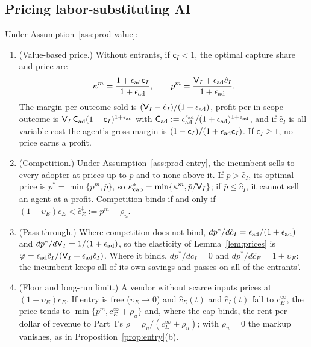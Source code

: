 \subsection{Pricing labor-substituting AI}\label{sec:product-price}

\begin{proposition}\label{prop:prod-price}
Under Assumption~\ref{ass:prod-value}:
\begin{enumerate}
\item[(a)] (Value-based price.) Without entrants, if $\mathsf c_I<1$, the optimal capture share and price are
\begin{equation}\label{eq:prod-kappa}
\kappa^m=\frac{1+\epsilon_{\rm ad}\mathsf c_I}{1+\epsilon_{\rm ad}},\qquad p^m=\frac{\mathsf V_I+\epsilon_{\rm ad}\hat c_I}{1+\epsilon_{\rm ad}} .
\end{equation}
The margin per outcome sold is $(\mathsf V_I-\hat c_I)/(1+\epsilon_{\rm ad})$, profit per in-scope outcome is $\mathsf V_I\,\mathsf C_{\rm ad}(1-\mathsf c_I)^{1+\epsilon_{\rm ad}}$ with $\mathsf C_{\rm ad}:=\epsilon_{\rm ad}^{\epsilon_{\rm ad}}/(1+\epsilon_{\rm ad})^{1+\epsilon_{\rm ad}}$, and if $\hat c_I$ is all variable cost the agent's gross margin is $(1-\mathsf c_I)/(1+\epsilon_{\rm ad}\mathsf c_I)$. If $\mathsf c_I\ge 1$, no price earns a profit.
\item[(b)] (Competition.) Under Assumption~\ref{ass:prod-entry}, the incumbent sells to every adopter at prices up to $\bar p$ and to none above it. If $\bar p>\hat c_I$, its optimal price is $p^*=\min\{p^m,\bar p\}$, so $\kappa^*_{\rm cap}=\min\{\kappa^m,\bar p/\mathsf V_I\}$; if $\bar p\le\hat c_I$, it cannot sell an agent at a profit. Competition binds if and only if $(1+\upsilon_E)\hat c_E<\hat c^{\ddagger}_E:=p^m-\rho_u$.
\item[(c)] (Pass-through.) Where competition does not bind, $dp^*/d\hat c_I=\epsilon_{\rm ad}/(1+\epsilon_{\rm ad})$ and $dp^*/d\mathsf V_I=1/(1+\epsilon_{\rm ad})$, so the elasticity of Lemma~\ref{lem:prices} is $\varphi=\epsilon_{\rm ad}\hat c_I/(\mathsf V_I+\epsilon_{\rm ad}\hat c_I)$. Where it binds, $dp^*/d\hat c_I=0$ and $dp^*/d\hat c_E=1+\upsilon_E$: the incumbent keeps all of its own savings and passes on all of the entrants'.
\item[(d)] (Floor and long-run limit.) A vendor without scarce inputs prices at $(1+\upsilon_E)\hat c_E$. If entry is free ($\upsilon_E\to 0$) and $\hat c_E(t)$ and $\hat c_I(t)$ fall to $c_E^\infty$, the price tends to $\min\{p^m,c_E^\infty+\rho_u\}$ and, where the cap binds, the rent per dollar of revenue to Part~I's $\rho=\rho_u/(c_E^\infty+\rho_u)$; with $\rho_u=0$ the markup vanishes, as in Proposition~\ref{prop:entry}(b).

\end{enumerate}
\end{proposition}
